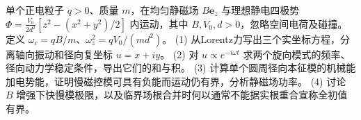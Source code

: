 单个正电粒子 \(q>0\)、质量 \(m\)，在均匀静磁场 \(B\boldsymbol e_z\) 与理想静电四极势
\(\Phi=\frac{V_0}{2d^2}[z^2-(x^2+y^2)/2]\) 内运动，其中 \(B,V_0,d>0\)，忽略空间电荷及碰撞。定义 \(\omega_c=qB/m\)、\(\omega_z^2=qV_0/(md^2)\)。
(1) 从Lorentz力写出三个实坐标方程，分离轴向振动和径向复坐标 \(u=x+iy\)。
(2) 对 \(u\propto e^{-i\omega t}\) 求两个旋向模式的频率、径向动力学稳定条件，导出它们的和与积。
(3) 计算单个圆周径向本征模的机械能加电势能，证明慢磁控模可具有负能而运动仍有界，分析静磁场功率。
(4) 讨论 \(B\) 增强下快慢模极限，以及临界场根合并时何以通常不能据实根重合宣称全初值有界。
